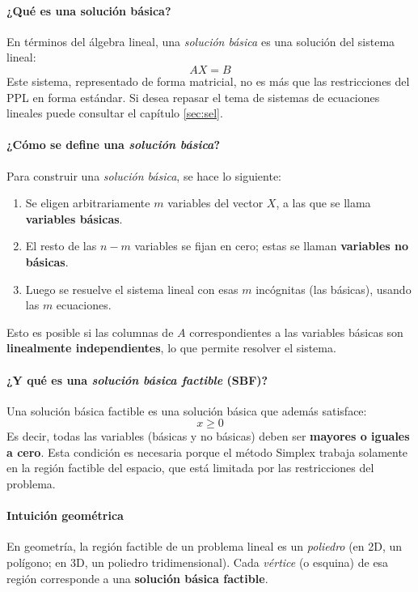\paragraph{¿Qué es una solución básica?}

En términos del álgebra lineal, una \textit{solución básica} es una solución del sistema lineal:
\[
AX = B
\]
Este sistema, representado de forma matricial, no es más que las restricciones del PPL en forma estándar. Si desea repasar el tema de sistemas de ecuaciones lineales puede consultar el capítulo \ref{sec:sel}.

\paragraph{¿Cómo se define una \textit{solución básica}?}

Para construir una \textit{solución básica}, se hace lo siguiente:
\begin{enumerate}
  \item Se eligen arbitrariamente \(m\) variables del vector \(X\), a las que se llama \textbf{variables básicas}.
  \item El resto de las \(n - m\) variables se fijan en cero; estas se llaman \textbf{variables no básicas}.
  \item Luego se resuelve el sistema lineal con esas \(m\) incógnitas (las básicas), usando las \(m\) ecuaciones.
\end{enumerate}
Esto es posible si las columnas de \(A\) correspondientes a las variables básicas son \textbf{linealmente independientes}, lo que permite resolver el sistema.

\paragraph{¿Y qué es una \textit{solución básica factible} (SBF)?}

Una solución básica factible es una solución básica que además satisface:
\[
x \geq 0
\]
Es decir, todas las variables (básicas y no básicas) deben ser \textbf{mayores o iguales a cero}. Esta condición es necesaria porque el método Simplex trabaja solamente en la región factible del espacio, que está limitada por las restricciones del problema.

\paragraph{Intuición geométrica}

En geometría, la región factible de un problema lineal es un \textit{poliedro} (en 2D, un polígono; en 3D, un poliedro tridimensional). Cada \textit{vértice} (o esquina) de esa región corresponde a una \textbf{solución básica factible}.

